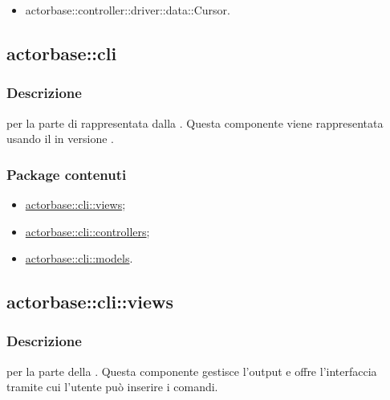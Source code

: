 \documentclass{scalatekids-article}
\begin{document}
\begin{itemize}
\item actorbase::controller::driver::data::Cursor.
\end{itemize}


\subsection{actorbase::cli}
\label{sec:actorbase::cli}

\subsubsection{Descrizione}

 per la parte di  rappresentata dalla .
Questa componente viene rappresentata usando il 
 in versione .

\subsubsection{Package contenuti}

\begin{itemize}
\item \hyperref[sec:actorbase::cli::views]{actorbase::cli::views};
\item \hyperref[sec:actorbase::cli::controllers]{actorbase::cli::controllers};
\item \hyperref[sec:actorbase::cli::models]{actorbase::cli::models}.
\end{itemize}

\subsection{actorbase::cli::views}
\label{sec:actorbase::cli::views}

\subsubsection{Descrizione}

 per la parte  della . Questa componente
gestisce l'output e offre l'interfaccia tramite cui l'utente può inserire i
comandi.
\end{document}
